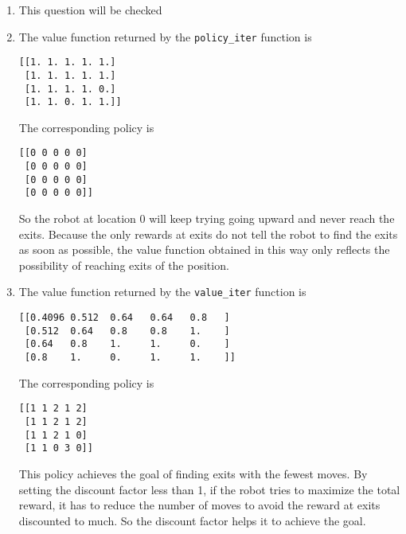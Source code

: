 \begin{enumerate}
  \item This question will be checked 
  \item The value function returned by the \texttt{policy\_iter} function is
  \begin{verbatim}
[[1. 1. 1. 1. 1.]
 [1. 1. 1. 1. 1.]
 [1. 1. 1. 1. 0.]
 [1. 1. 0. 1. 1.]]
  \end{verbatim}
  The corresponding policy is
  \begin{verbatim}
[[0 0 0 0 0]
 [0 0 0 0 0]
 [0 0 0 0 0]
 [0 0 0 0 0]]
  \end{verbatim}
  So the robot at location 0 will keep trying going upward and
  never reach the exits. Because the only rewards at exits do
  not tell the robot to find the exits as soon as possible, the
  value function obtained in this way only reflects the possibility
  of reaching exits of the position.
  \item The value function returned by the \texttt{value\_iter}
  function is
  \begin{verbatim}
[[0.4096 0.512  0.64   0.64   0.8   ]
 [0.512  0.64   0.8    0.8    1.    ]
 [0.64   0.8    1.     1.     0.    ]
 [0.8    1.     0.     1.     1.    ]]
\end{verbatim}
  The corresponding policy is
  \begin{verbatim}
[[1 1 2 1 2]
 [1 1 2 1 2]
 [1 1 2 1 0]
 [1 1 0 3 0]]
  \end{verbatim}
  This policy achieves the goal of finding exits with the fewest
  moves. By setting the discount factor less than 1, if the robot
  tries to maximize the total reward, it has to reduce the number
  of moves to avoid the reward at exits discounted to much. So
  the discount factor helps it to achieve the goal.
\end{enumerate}

